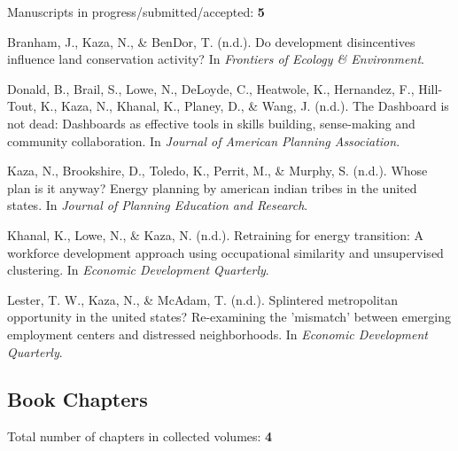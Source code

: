 \documentclass[11pt,a4paper,]{awesome-cv}
\newlength{\cslhangindent}
\newenvironment{CSLReferences}[2] %
 {\begin{list}{}{%
  \setlength{\itemindent}{0pt}
  \setlength{\leftmargin}{0pt}
  \setlength{\parsep}{0pt}
  \ifodd #1
   \setlength{\leftmargin}{\cslhangindent}
   \setlength{\itemindent}{-1\cslhangindent}
  \fi
  \setlength{\itemsep}{#2\baselineskip}}}
 {\end{list}}
\begin{document}
Manuscripts in progress/submitted/accepted: \textbf{5}

\label{refs-562c2f672dbd7502ca65d02a8d811cb9}
\begin{CSLReferences}{1}{0}
Branham, J., Kaza, N., \& BenDor, T. (n.d.). Do development
disincentives influence land conservation activity? In \emph{Frontiers
of Ecology \& Environment}.

Donald, B., Brail, S., Lowe, N., DeLoyde, C., Heatwole, K., Hernandez,
F., Hill-Tout, K., Kaza, N., Khanal, K., Planey, D., \& Wang, J. (n.d.).
The Dashboard is not dead: Dashboards as effective tools in skills
building, sense-making and community collaboration. In \emph{Journal of
American Planning Association}.

Kaza, N., Brookshire, D., Toledo, K., Perrit, M., \& Murphy, S. (n.d.).
Whose plan is it anyway? Energy planning by american indian tribes in
the united states. In \emph{Journal of Planning Education and Research}.

Khanal, K., Lowe, N., \& Kaza, N. (n.d.). Retraining for energy
transition: A workforce development approach using occupational
similarity and unsupervised clustering. In \emph{Economic Development
Quarterly}.

Lester, T. W., Kaza, N., \& McAdam, T. (n.d.). Splintered metropolitan
opportunity in the united states? Re-examining the 'mismatch' between
emerging employment centers and distressed neighborhoods. In
\emph{Economic Development Quarterly}.

\end{CSLReferences}

\subsection{Book Chapters}\label{book-chapters}

Total number of chapters in collected volumes: \textbf{4}
\end{document}
